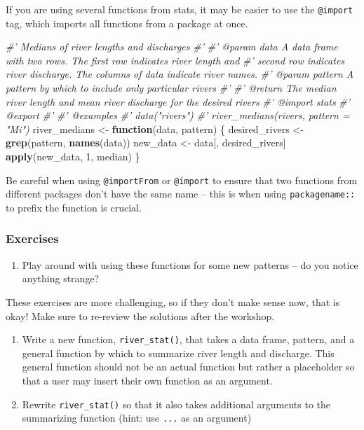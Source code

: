 \documentclass[
]{book}
\newenvironment{Shaded}{\begin{snugshade}}{\end{snugshade}}
\newcommand{\CommentTok}[1]{\textcolor[rgb]{0.56,0.35,0.01}{\textit{#1}}}
\newcommand{\ControlFlowTok}[1]{\textcolor[rgb]{0.13,0.29,0.53}{\textbf{#1}}}
\newcommand{\DecValTok}[1]{\textcolor[rgb]{0.00,0.00,0.81}{#1}}
\newcommand{\KeywordTok}[1]{\textcolor[rgb]{0.13,0.29,0.53}{\textbf{#1}}}
\newcommand{\NormalTok}[1]{#1}
\newcommand{\StringTok}[1]{\textcolor[rgb]{0.31,0.60,0.02}{#1}}
\providecommand{\tightlist}{%
  \setlength{\itemsep}{0pt}\setlength{\parskip}{0pt}}
\begin{document}
If you are using several functions from stats, it may be easier to use the \texttt{@import} tag, which imports all functions from a package at once.

\begin{Shaded}
\begin{Highlighting}[]
\CommentTok{#' Medians of river lengths and discharges}
\CommentTok{#'}
\CommentTok{#' @param data A data frame with two rows. The first row indicates river length and}
\CommentTok{#'   second row indicates river discharge. The columns of data indicate river names.}
\CommentTok{#' @param pattern A pattern by which to include only particular rivers}
\CommentTok{#'}
\CommentTok{#' @return The median river length and mean river discharge for the desired rivers}
\CommentTok{#' @import stats}
\CommentTok{#' @export}
\CommentTok{#'}
\CommentTok{#' @examples}
\CommentTok{#' data("rivers")}
\CommentTok{#' river_medians(rivers, pattern = "Mi")}
\NormalTok{river_medians <-}\StringTok{ }\ControlFlowTok{function}\NormalTok{(data, pattern) \{}
\NormalTok{  desired_rivers <-}\StringTok{ }\KeywordTok{grep}\NormalTok{(pattern, }\KeywordTok{names}\NormalTok{(data))}
\NormalTok{  new_data <-}\StringTok{ }\NormalTok{data[, desired_rivers]}
  \KeywordTok{apply}\NormalTok{(new_data, }\DecValTok{1}\NormalTok{, median)}
\NormalTok{\}}
\end{Highlighting}
\end{Shaded}

Be careful when using \texttt{@importFrom} or \texttt{@import} to ensure that two functions from different packages don't have the same name -- this is when using \texttt{packagename::} to prefix the function is crucial.

\hypertarget{exercises-2}{%
\subsubsection{Exercises}\label{exercises-2}}

\begin{enumerate}
\def\labelenumi{\arabic{enumi}.}
\tightlist
\item
  Play around with using these functions for some new patterns -- do you notice anything strange?
\end{enumerate}

These exercises are more challenging, so if they don't make sense now, that is okay! Make sure to re-review the solutions after the workshop.

\begin{enumerate}
\def\labelenumi{\arabic{enumi}.}
\setcounter{enumi}{1}
\item
  Write a new function, \texttt{river\_stat()}, that takes a data frame, pattern, and a general function by which to summarize river length and discharge. This general function should not be an actual function but rather a placeholder so that a user may insert their own function as an argument.
\item
  Rewrite \texttt{river\_stat()} so that it also takes additional arguments to the summarizing function (hint: use \texttt{...} as an argument)
\end{enumerate}
\end{document}
